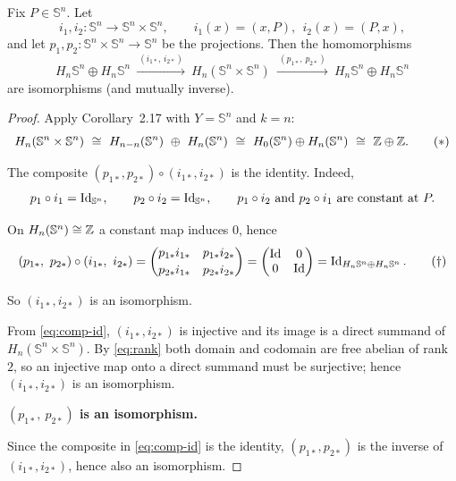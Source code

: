 
\begin{proposition}\label{prop:2.18}
Fix $P\in \mathbb{S}^n$. Let
\[
i_1,i_2:\mathbb{S}^n\longrightarrow \mathbb{S}^n\times \mathbb{S}^n,\qquad
i_1(x)=(x,P),\ \ i_2(x)=(P,x),
\]
and let $p_1,p_2:\mathbb{S}^n\times \mathbb{S}^n\to \mathbb{S}^n$ be the projections.
Then the homomorphisms
\[
H_n\mathbb{S}^n\oplus H_n\mathbb{S}^n
\ \xrightarrow{\ (i_{1*},\,i_{2*})\ }\ 
H_n(\mathbb{S}^n\times \mathbb{S}^n)
\ \xrightarrow{\ (p_{1*},\,p_{2*})\ }\ 
H_n\mathbb{S}^n\oplus H_n\mathbb{S}^n
\tag{2.11}\label{eq:2.11}
\]
are isomorphisms (and mutually inverse).
\end{proposition}

\begin{proof}

Apply Corollary~2.17 with $Y=\mathbb{S}^n$ and $k=n$:
\[
H_n(\mathbb{S}^n\times \mathbb{S}^n)\ \cong\ H_{n-n}(\mathbb{S}^n)\ \oplus\ H_n(\mathbb{S}^n)
\ \cong\ H_0(\mathbb{S}^n)\oplus H_n(\mathbb{S}^n)\ \cong\ \Bbb Z\oplus\Bbb Z .
\tag{$\ast$}\label{eq:rank}
\]

The composite $(p_{1*},p_{2*})\circ(i_{1*},i_{2*})$ is the identity. Indeed,
\[
p_1\circ i_1=\operatorname{Id}_{\mathbb{S}^n},\qquad
p_2\circ i_2=\operatorname{Id}_{\mathbb{S}^n},\qquad
p_1\circ i_2 \text{ and } p_2\circ i_1 \text{ are constant at }P .
\]

On $H_n(\mathbb{S}^n)\cong\Bbb Z$ a constant map induces $0$, hence
\[
(p_{1*},~p_{2*})\circ(i_{1*},~i_{2*})
=\begin{pmatrix} p_{1*}i_{1*} & p_{1*}i_{2*}\\[2pt]
                  p_{2*}i_{1*} & p_{2*}i_{2*}\end{pmatrix}
=\begin{pmatrix} \operatorname{Id} & 0\\ 0 & \operatorname{Id}\end{pmatrix}
=\operatorname{Id}_{H_n\mathbb{S}^n\oplus H_n\mathbb{S}^n}.
\tag{$\dagger$}\label{eq:comp-id}
\]

So $(i_{1*},i_{2*})$ is an isomorphism.

From \eqref{eq:comp-id}, $(i_{1*},i_{2*})$ is injective and its image is a direct
summand of $H_n(\mathbb{S}^n\times \mathbb{S}^n)$. By \eqref{eq:rank} both domain and codomain are
free abelian of rank $2$, so an injective map onto a direct summand must be
surjective; hence $(i_{1*},i_{2*})$ is an isomorphism.

\textbf{$(p_{1*},~p_{2*})$ is an isomorphism.}

Since the composite in \eqref{eq:comp-id} is the identity, $(p_{1*},p_{2*})$
is the inverse of $(i_{1*},i_{2*})$, hence also an isomorphism.

\end{proof}

